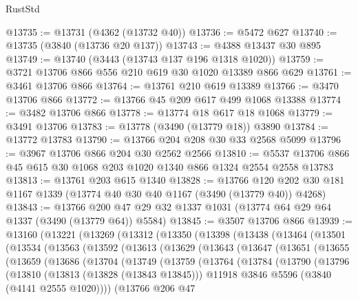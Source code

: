 \begin{lexlean}{RustStd}
\begin{coremodule}
@13735 := @13731 (@4362 (@13732 @40))
@13736 := @5472 @627
@13740 := @13735 (@3840 (@13736 @20 @137))
@13743 := @4388 @13437 @30 @895
@13749 := @13740 (@3443 (@13743 @137 @196 @1318 @1020))
@13759 := @3721 @13706 @866 @556 @210 @619 @30 @1020 @13389 @866 @629
@13761 := @3461 @13706 @866
@13764 := @13761 @210 @619 @13389
@13766 := @3470 @13706 @866
@13772 := @13766 @45 @209 @617 @499 @1068 @13388
@13774 := @3482 @13706 @866
@13778 := @13774 @18 @617 @18 @1068
@13779 := @3491 @13706
@13783 := @13778 (@3490 (@13779 @18)) @3890
@13784 := @13772 @13783
@13790 := @13766 @204 @208 @30 @33 @2568 @5099
@13796 := @3967 @13706 @866 @204 @30 @2562 @2566
@13810 := @5537 @13706 @866 @45 @615 @30 @1068 @203 @1020 @1340 @866 @1324 @2554 @2558 @13783
@13813 := @13761 @203 @615 @1340
@13828 := @13766
    @120
    @202
    @30
    @181
    @1167
    @1339
    (@13774 @40 @30 @40 @1167 (@3490 (@13779 @40)) @4268)
@13843 := @13766 @200 @47 @29 @32 @1337 @1031 (@13774 @64 @29 @64 @1337 (@3490 (@13779 @64)) @5584)
@13845 := @3507 @13706 @866
@13939 := @13160
    (@13221
      (@13269
        (@13312
          (@13350
            (@13398
              (@13438
                (@13464
                  (@13501
                    (@13534
                      (@13563
                        (@13592
                          (@13613
                            (@13629
                              (@13643
                                (@13647
                                  (@13651
                                    (@13655
                                      (@13659
                                        (@13686
                                          (@13704
                                            (@13749
                                              (@13759
                                                (@13764
                                                  (@13784
                                                    (@13790
                                                      (@13796
                                                        (@13810
                                                          (@13813 (@13828 (@13843 @13845)))
                                                          @11918
                                                          @3846
                                                          @5596
                                                          (@3840 (@4141 @2555 @1020))))
                                                      (@13766
                                                        @206
                                                        @47

\end{coremodule}
\end{lexlean}

